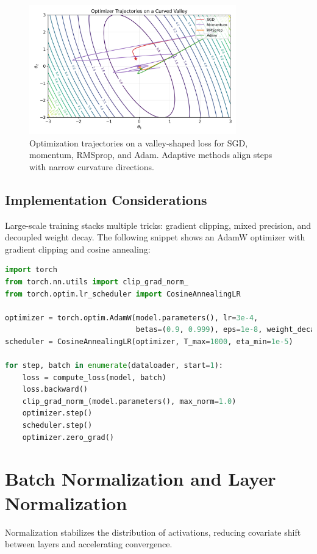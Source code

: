 \documentclass{article}
\begin{document}
\begin{figure}[H]
  \centering
  \includegraphics[width=0.8\textwidth]{optimizer_dynamics.png}
  \caption{Optimization trajectories on a valley-shaped loss for SGD, momentum, RMSprop, and Adam. Adaptive methods align steps with narrow curvature directions.}
  \label{fig:optimizer_dynamics}
\end{figure}
\FloatBarrier

\subsection{Implementation Considerations}
Large-scale training stacks multiple tricks: gradient clipping, mixed precision, and decoupled weight decay. The following snippet shows an AdamW optimizer with gradient clipping and cosine annealing:

\begin{lstlisting}[language=Python, caption={AdamW with gradient clipping and cosine learning rate schedule.}]
import torch
from torch.nn.utils import clip_grad_norm_
from torch.optim.lr_scheduler import CosineAnnealingLR

optimizer = torch.optim.AdamW(model.parameters(), lr=3e-4,
                              betas=(0.9, 0.999), eps=1e-8, weight_decay=0.01)
scheduler = CosineAnnealingLR(optimizer, T_max=1000, eta_min=1e-5)

for step, batch in enumerate(dataloader, start=1):
    loss = compute_loss(model, batch)
    loss.backward()
    clip_grad_norm_(model.parameters(), max_norm=1.0)
    optimizer.step()
    scheduler.step()
    optimizer.zero_grad()
\end{lstlisting}

\section{Batch Normalization and Layer Normalization}
Normalization stabilizes the distribution of activations, reducing covariate shift between layers and accelerating convergence.
\end{document}
